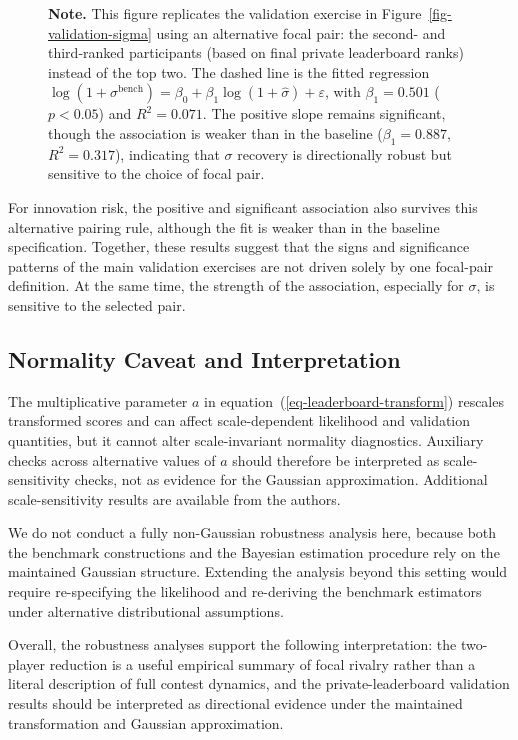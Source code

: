 \documentclass[mnsc]{informs3}
\begin{document}
\begin{figure}[tbp]
\begin{minipage}{\textwidth}
{\footnotesize
\textbf{Note.} This figure replicates the validation exercise in Figure~\ref{fig-validation-sigma} using an alternative focal pair: the second- and third-ranked participants (based on final private leaderboard ranks) instead of the top two. The dashed line is the fitted regression $\log(1 + \sigma^{\mathrm{bench}}) = \beta_0 + \beta_1 \log(1 + \hat{\sigma}) + \varepsilon$, with $\beta_1 = 0.501$ ($p < 0.05$) and $R^2 = 0.071$. The positive slope remains significant, though the association is weaker than in the baseline ($\beta_1 = 0.887$, $R^2 = 0.317$), indicating that $\sigma$ recovery is directionally robust but sensitive to the choice of focal pair.
}
\end{minipage}
\end{figure}

For innovation risk, the positive and significant association also survives this alternative pairing rule, although the fit is weaker than in the baseline specification.
Together, these results suggest that the signs and significance patterns of the main validation exercises are not driven solely by one focal-pair definition. At the same time, the strength of the association, especially for $\sigma$, is sensitive to the selected pair.


\subsection{Normality Caveat and Interpretation}\label{sect-robust-normality}

The multiplicative parameter $a$ in equation~(\ref{eq-leaderboard-transform}) rescales transformed scores and can affect scale-dependent likelihood and validation quantities, but it cannot alter scale-invariant normality diagnostics. Auxiliary checks across alternative values of $a$ should therefore be interpreted as scale-sensitivity checks, not as evidence for the Gaussian approximation. Additional scale-sensitivity results are available from the authors.

We do not conduct a fully non-Gaussian robustness analysis here, because both the benchmark constructions and the Bayesian estimation procedure rely on the maintained Gaussian structure.
Extending the analysis beyond this setting would require re-specifying the likelihood and re-deriving the benchmark estimators under alternative distributional assumptions.

Overall, the robustness analyses support the following interpretation: the two-player reduction is a useful empirical summary of focal rivalry rather than a literal description of full contest dynamics, and the private-leaderboard validation results should be interpreted as directional evidence under the maintained transformation and Gaussian approximation.
\end{document}
